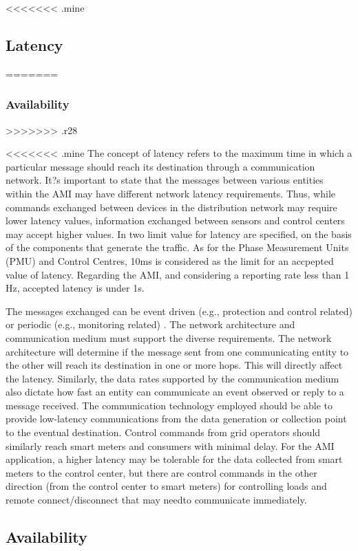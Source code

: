 \documentclass[11pt,draftclsnofoot,onecolumn]{IEEEtran}
\begin{document}
<<<<<<< .mine
\subsection{Latency}
=======
\subsubsection{Availability}
>>>>>>> .r28

<<<<<<< .mine
The concept of latency refers to the maximum time in which a particular message should reach its destination through a communication network. It?s important to state that the messages between various entities within the AMI may have different network latency requirements. Thus, while commands exchanged between devices in the distribution network may require lower latency values, information exchanged between sensors and control centers may accept higher values. In \cite{Xu2011} two limit value for latency are specified, on the basis of the components that generate the traffic. As for the Phase Measurement Units (PMU) and Control Centres, 10ms is considered as the limit for an accpepted value of latency.  Regarding the AMI, and considering a reporting rate less than 1 Hz, accepted latency is under 1s.

The messages exchanged can be event driven (e.g., protection and control related) or periodic (e.g., monitoring related) \cite{Winter2012}. The network architecture and communication medium must support the diverse requirements. The network architecture will determine if the message sent from one communicating entity to the other will reach its destination in one or more hops. This will directly affect the latency. Similarly, the data rates supported by the communication medium also dictate how fast an entity can communicate an event observed or reply to a message received.  The communication technology employed should be able to provide low-latency communications from the data generation or collection point to the eventual destination. Control commands from grid operators should similarly reach smart meters and consumers with minimal delay. For the AMI application, a higher latency may be tolerable for the data collected from smart meters to the control center, but there are control commands in the other direction (from the control center to smart meters) for controlling loads and remote connect/disconnect that may needto communicate immediately.

\subsection{Availability}
\end{document}
